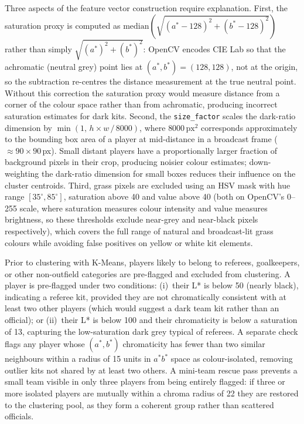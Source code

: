 Three aspects of the feature vector construction require explanation. First, the saturation proxy is computed as $\text{median}\!\left(\sqrt{(a^* - 128)^2 + (b^* - 128)^2}\right)$ rather than simply $\sqrt{(a^*)^2 + (b^*)^2}$: OpenCV encodes CIE Lab so that the achromatic (neutral grey) point lies at $(a^*, b^*) = (128, 128)$, not at the origin, so the subtraction re-centres the distance measurement at the true neutral point. Without this correction the saturation proxy would measure distance from a corner of the colour space rather than from achromatic, producing incorrect saturation estimates for dark kits. Second, the \texttt{size\_factor} scales the dark-ratio dimension by $\min(1,\, h \times w\, /\, 8000)$, where $8000\,\text{px}^2$ corresponds approximately to the bounding box area of a player at mid-distance in a broadcast frame ($\approx 90 \times 90$\,px). Small distant players have a proportionally larger fraction of background pixels in their crop, producing noisier colour estimates; down-weighting the dark-ratio dimension for small boxes reduces their influence on the cluster centroids. Third, grass pixels are excluded using an HSV mask with hue range $[35^\circ, 85^\circ]$, saturation above 40 and value above 40 (both on OpenCV's 0--255 scale, where saturation measures colour intensity and value measures brightness, so these thresholds exclude near-grey and near-black pixels respectively), which covers the full range of natural and broadcast-lit grass colours while avoiding false positives on yellow or white kit elements.

Prior to clustering with K-Means, players likely to belong to referees, goalkeepers, or other non-outfield categories are pre-flagged and excluded from clustering. A player is pre-flagged under two conditions: (i)~their L* is below 50 (nearly black), indicating a referee kit, provided they are not chromatically consistent with at least two other players (which would suggest a dark team kit rather than an official); or (ii)~their L* is below 100 and their chromaticity is below a saturation of 13, capturing the low-saturation dark grey typical of referees. A separate check flags any player whose $(a^*, b^*)$ chromaticity has fewer than two similar neighbours within a radius of 15 units in $a^*b^*$ space as colour-isolated, removing outlier kits not shared by at least two others. A mini-team rescue pass prevents a small team visible in only three players from being entirely flagged: if three or more isolated players are mutually within a chroma radius of 22 they are restored to the clustering pool, as they form a coherent group rather than scattered officials.

